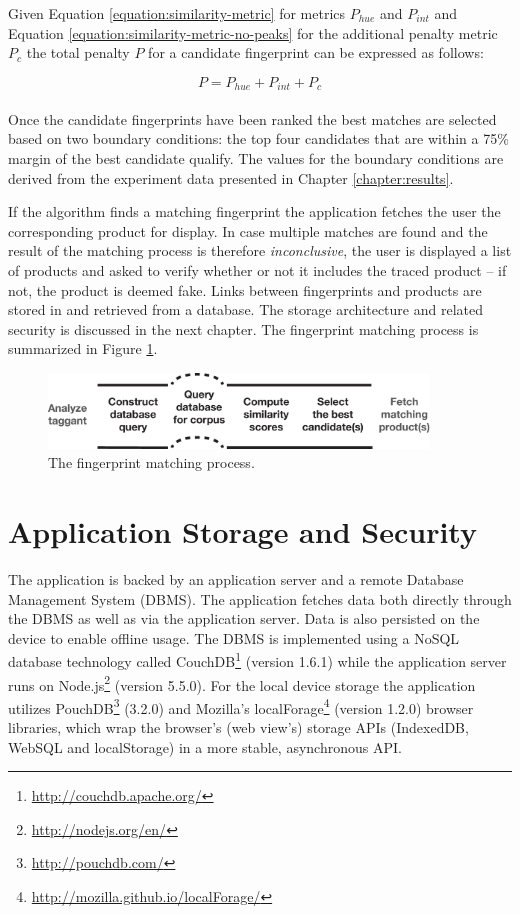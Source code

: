 \documentclass[thesis.tex]{subfiles}
\begin{document}
\noindent Given Equation \ref{equation:similarity-metric} for metrics $P_{hue}$ and $P_{int}$ and Equation \ref{equation:similarity-metric-no-peaks} for the additional penalty metric $P_c$ the total penalty $P$ for a candidate fingerprint can be expressed as follows:

\begin{equation}
	P = P_{hue} + P_{int} + P_{c}
\end{equation}
\\
Once the candidate fingerprints have been ranked the best matches are selected based on two boundary conditions: the top four candidates that are within a 75\% margin of the best candidate qualify. The values for the boundary conditions are derived from the experiment data presented in Chapter \ref{chapter:results}.

If the algorithm finds a matching fingerprint the application fetches the user the corresponding product for display. In case multiple matches are found and the result of the matching process is therefore \emph{inconclusive}, the user is displayed a list of products and asked to verify whether or not it includes the traced product -- if not, the product is deemed fake. Links between fingerprints and products are stored in and retrieved from a database. The storage architecture and related security is discussed in the next chapter. The fingerprint matching process is summarized in Figure \ref{figure:matching-process}.

\begin{figure}[h]
\centering \includegraphics[width=0.9\textwidth,height=\textheight,keepaspectratio=true]{images/design_implementation/matching_process}
\caption{The fingerprint matching process.\label{figure:matching-process}}
\end{figure}

\section{Application Storage and Security}
\label{chapter:storage-security}

The application is backed by an application server and a remote Database Management System (DBMS). The application fetches data both directly through the DBMS as well as via the application server. Data is also persisted on the device to enable offline usage. The DBMS is implemented using a NoSQL database technology called CouchDB\footnote{\url{http://couchdb.apache.org/}} (version 1.6.1) while the application server runs on Node.js\footnote{\url{http://nodejs.org/en/}} (version 5.5.0). For the local device storage the application utilizes PouchDB\footnote{\url{http://pouchdb.com/}} (3.2.0) and Mozilla's localForage\footnote{\url{http://mozilla.github.io/localForage/}} (version 1.2.0) browser libraries, which wrap the browser's (web view's) storage APIs (IndexedDB, WebSQL and localStorage) in a more stable, asynchronous API.
\end{document}
